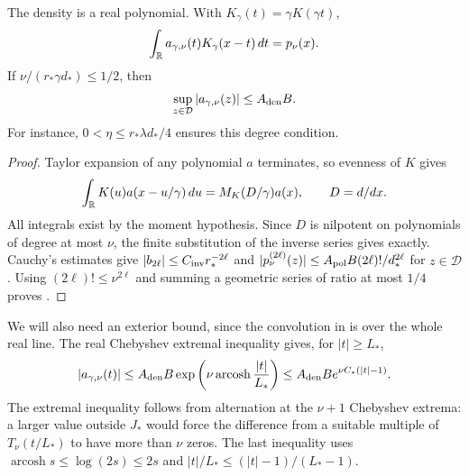 \begin{lemma}
\label{lem:psi-deconv}\label{lem:psi-density}
The density is a real polynomial. With $K_\gamma(t)=\gamma K(\gamma t)$,
\begin{equation}
 \int_\mathbb R a_{\gamma,\nu}(t)K_\gamma(x-t)\,dt=p_\nu(x).
 \label{eq:psi-exact-convolution}
\end{equation}
If $\nu/(r_*\gamma d_*)\le1/2$, then
\begin{equation}
 \sup_{z\in\mathcal D}|a_{\gamma,\nu}(z)|\le A_{\rm den}B.
 \label{eq:psi-density-bound}
\end{equation}
For instance, $0<\eta\le r_*\lambda d_*/4$ ensures this degree condition.
\end{lemma}
\begin{proof}
Taylor expansion of any polynomial $a$ terminates, so evenness of $K$ gives
\[
 \int_\mathbb R K(u)a(x-u/\gamma)\,du=M_K(D/\gamma)a(x),\qquad D=d/dx.
\]
All integrals exist by the moment hypothesis. Since $D$ is nilpotent on
polynomials of degree at most $\nu$, the finite substitution of the inverse
series gives  exactly.
Cauchy's estimates give $|b_{2\ell}|\le C_{\rm inv}r_*^{-2\ell}$ and
$|p_\nu^{(2\ell)}(z)|\le A_{\rm pol}B(2\ell)!/d_*^{2\ell}$ for
$z\in\mathcal D$. Using $(2\ell)!\le\nu^{2\ell}$ and summing a geometric
series of ratio at most $1/4$ proves .
\end{proof}
We will also need an exterior bound, since the convolution in
 is over the whole real line. The real
Chebyshev extremal inequality gives, for $|t|\ge L_*$,
\begin{equation}
 |a_{\gamma,\nu}(t)|
 \le A_{\rm den}B\exp\left(\nu\operatorname{arcosh}\frac{|t|}{L_*}\right)
 \le A_{\rm den}B e^{\nu C_*(|t|-1)}.
 \label{eq:psi-exterior}
\end{equation}
The extremal inequality follows from alternation at the $\nu+1$ Chebyshev
extrema: a larger value outside $J_*$ would force the difference from a
suitable multiple of $T_\nu(t/L_*)$ to have more than $\nu$ zeros.
The last inequality uses $\operatorname{arcosh}s\le\log(2s)\le2s$ and
$|t|/L_*\le(|t|-1)/(L_*-1)$.

